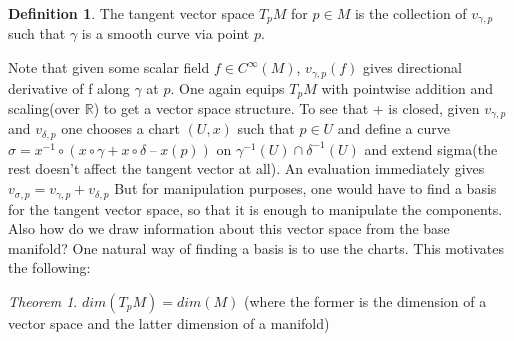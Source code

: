 \documentclass[a4paper]{report}
\theoremstyle{definition}
\newtheorem{definition}{Definition}[section]
\theoremstyle{remark}
\newtheorem*{theorem}{Theorem}
\begin{document}
		\begin{definition}
			The tangent vector space $T_pM$ for $p \in M$ is the collection of $v_{\gamma,p}$ such that $\gamma$ is a smooth curve via point $p$.
		\end{definition}
		Note that given some scalar field $f \in C^\infty(M)$, $v_{\gamma,p}(f)$ gives directional derivative of f along $\gamma$ at $p$.
		One again equips $T_pM$ with pointwise addition and scaling(over $\mathbb{R}$) to get a vector space structure. To see that + is closed, given $v_{\gamma,p}$ and $v_{\delta,p}$ one chooses a chart $(U,x)$ such that $p \in U$ and define a curve 
		$\sigma = x^{-1}\circ(x\circ\gamma + x\circ\delta \hspace{3pt} – \hspace{3pt}x(p))$ on $\gamma^{-1}(U)\cap \delta^{-1}(U)$ and extend sigma(the rest doesn’t affect the tangent vector at all).
		An evaluation immediately gives $v_{\sigma,p} =     v_{\gamma,p} + v_{\delta,p}$
		But for manipulation purposes, one would have to find a basis for the tangent vector space, so that it is enough to manipulate the components. Also how do we draw information about this vector space from the base manifold?
		One natural way of finding a basis is to use the charts. This motivates the following:
		\begin{theorem}
			$dim(T_pM)  = dim(M)$ (where the former is the dimension of a vector space and the latter dimension of a manifold)\end{theorem}
\end{document}
